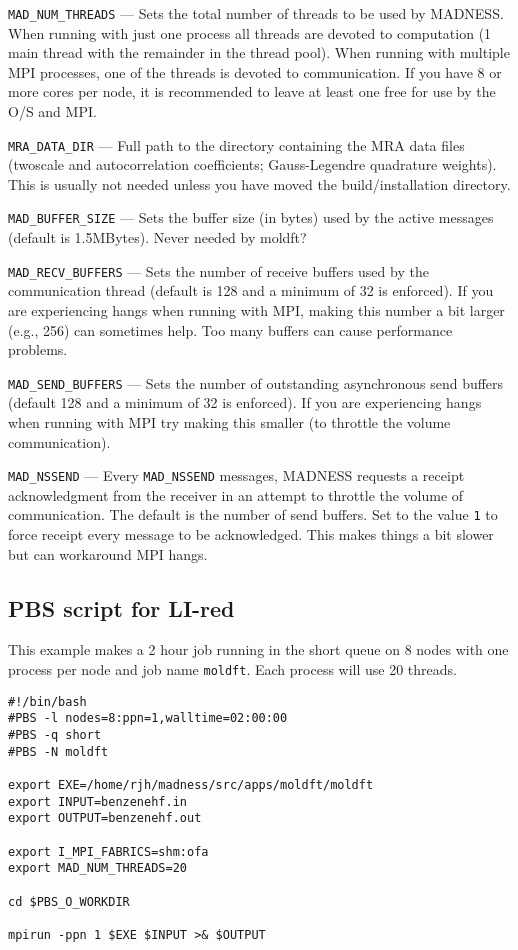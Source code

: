 \documentclass[letterpaper]{book}
\begin{document}
\verb+MAD_NUM_THREADS+ --- Sets the total number of threads to be used
by MADNESS.  When running with just one process all threads are
devoted to computation (1 main thread with the remainder in the thread
pool).  When running with multiple MPI processes, one of the threads
is devoted to communication.  If you have 8 or more cores per node, it
is recommended to leave at least one free for use by the O/S and MPI.

\verb+MRA_DATA_DIR+ --- Full path to the directory containing the MRA
data files (twoscale and autocorrelation coefficients; Gauss-Legendre
quadrature weights).  This is usually not needed unless you have moved
the build/installation directory.

\verb+MAD_BUFFER_SIZE+ --- Sets the buffer size (in bytes) used by the
active messages (default is 1.5MBytes).  Never needed by moldft?

\verb+MAD_RECV_BUFFERS+ --- Sets the number of receive buffers used by
the communication thread (default is 128 and a minimum of 32 is
enforced).  If you are experiencing hangs when running with MPI,
making this number a bit larger (e.g., 256) can sometimes help. Too
many buffers can cause performance problems.

\verb+MAD_SEND_BUFFERS+ --- Sets the number of outstanding
asynchronous send buffers (default 128 and a minimum of 32 is
enforced).  If you are experiencing hangs when running with MPI try
making this smaller (to throttle the volume communication).

\verb+MAD_NSSEND+ --- Every \verb+MAD_NSSEND+ messages, MADNESS
requests a receipt acknowledgment from the receiver in an attempt to
throttle the volume of communication.  The default is the number of
send buffers.  Set to the value \verb+1+ to force receipt every
message to be acknowledged.  This makes things a bit slower but can
workaround MPI hangs.

\subsection{PBS script for LI-red}
\label{sec:pbslired}

This example makes a 2 hour job running in the short queue on 8 nodes
with one process per node and job name {\tt moldft}.  Each process
will use 20 threads.

\begin{verbatim}
#!/bin/bash                                                                     
#PBS -l nodes=8:ppn=1,walltime=02:00:00                                         
#PBS -q short                                                                   
#PBS -N moldft                                                                  

export EXE=/home/rjh/madness/src/apps/moldft/moldft
export INPUT=benzenehf.in
export OUTPUT=benzenehf.out

export I_MPI_FABRICS=shm:ofa
export MAD_NUM_THREADS=20

cd $PBS_O_WORKDIR

mpirun -ppn 1 $EXE $INPUT >& $OUTPUT
\end{verbatim}
\end{document}
